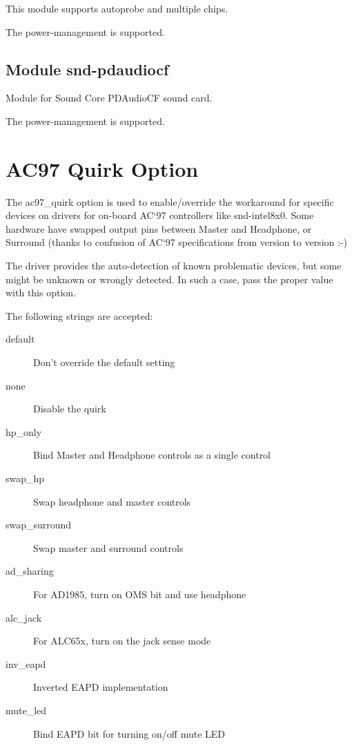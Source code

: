 \documentclass[a4paper,8pt,english]{sphinxmanual}
\begin{document}
This module supports autoprobe and multiple chips.

The power-management is supported.


\subsection{Module snd-pdaudiocf}
\label{sound/alsa-configuration:module-snd-pdaudiocf}
Module for Sound Core PDAudioCF sound card.

The power-management is supported.


\section{AC97 Quirk Option}
\label{sound/alsa-configuration:ac97-quirk-option}
The ac97\_quirk option is used to enable/override the workaround for
specific devices on drivers for on-board AC`97 controllers like
snd-intel8x0.  Some hardware have swapped output pins between Master
and Headphone, or Surround (thanks to confusion of AC`97
specifications from version to version :-)

The driver provides the auto-detection of known problematic devices,
but some might be unknown or wrongly detected.  In such a case, pass
the proper value with this option.

The following strings are accepted:
\begin{description}
\item[{default}] \leavevmode
Don't override the default setting

\item[{none}] \leavevmode
Disable the quirk

\item[{hp\_only}] \leavevmode
Bind Master and Headphone controls as a single control

\item[{swap\_hp}] \leavevmode
Swap headphone and master controls

\item[{swap\_surround}] \leavevmode
Swap master and surround controls

\item[{ad\_sharing}] \leavevmode
For AD1985, turn on OMS bit and use headphone

\item[{alc\_jack}] \leavevmode
For ALC65x, turn on the jack sense mode

\item[{inv\_eapd}] \leavevmode
Inverted EAPD implementation

\item[{mute\_led}] \leavevmode
Bind EAPD bit for turning on/off mute LED

\end{description}
\end{document}
